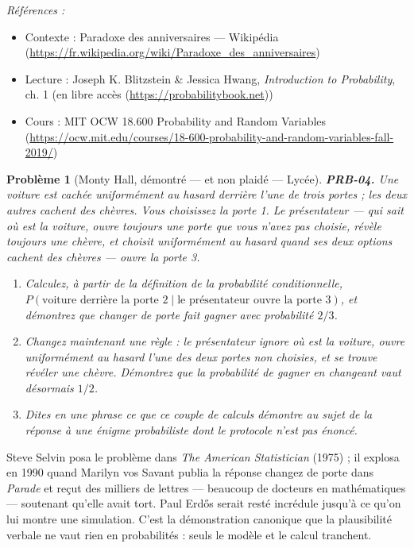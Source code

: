 \documentclass[11pt]{article}
\newtheorem{problem}{Problème}
\newenvironment{refs}{\par\small\noindent\emph{Références :}\begin{itemize}\setlength\itemsep{0pt}}{\end{itemize}\normalsize}
\begin{document}
\begin{refs}
\item Contexte : Paradoxe des anniversaires --- Wikipédia (\url{https://fr.wikipedia.org/wiki/Paradoxe_des_anniversaires})
\item Lecture : Joseph K. Blitzstein \& Jessica Hwang, \textit{Introduction to Probability}, ch. 1 (en libre accès (\url{https://probabilitybook.net}))
\item Cours : MIT OCW 18.600 Probability and Random Variables (\url{https://ocw.mit.edu/courses/18-600-probability-and-random-variables-fall-2019/})
\end{refs}

\bigskip

\begin{problem}[{Monty Hall, démontré --- et non plaidé --- Lycée}]
\textbf{PRB-04.} Une voiture est cachée uniformément au hasard derrière
l'une de trois portes ; les deux autres cachent des chèvres. Vous choisissez la porte 1. Le
présentateur --- qui sait où est la voiture, ouvre toujours une porte que vous n'avez pas choisie,
révèle toujours une chèvre, et choisit uniformément au hasard quand ses deux options cachent des
chèvres --- ouvre la porte 3.
\begin{enumerate}
\item[(i)] Calculez, à partir de la
définition de la probabilité conditionnelle, $ P(\text{voiture derrière la porte 2} \mid
\text{le présentateur ouvre la porte 3}) $, et démontrez que changer de porte fait gagner avec
probabilité $ 2/3 $.
\item[(ii)] Changez maintenant une règle : le présentateur ignore où est la voiture, ouvre uniformément
au hasard l'une des deux portes non choisies, et \textit{se trouve} révéler une chèvre. Démontrez
que la probabilité de gagner en changeant vaut désormais $ 1/2 $.
\item[(iii)] Dites en une phrase ce que ce couple de
calculs démontre au sujet de \og{} la \fg{} réponse à une énigme probabiliste dont le protocole n'est pas
énoncé.
\end{enumerate}

\end{problem}

\noindent Steve Selvin posa le problème dans \textit{The American Statistician} (1975) ; il
explosa en 1990 quand Marilyn vos Savant publia la réponse \og{} changez de porte \fg{} dans
\textit{Parade} et reçut des milliers de lettres --- beaucoup de docteurs en mathématiques ---
soutenant qu'elle avait tort. Paul Erd\H{o}s serait resté incrédule jusqu'à ce qu'on lui montre une
simulation. C'est la démonstration canonique que la plausibilité verbale ne vaut rien en
probabilités : seuls le modèle et le calcul tranchent.
\end{document}
